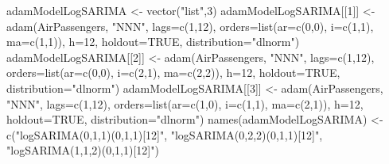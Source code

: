 \documentclass[
]{book}
\newenvironment{Shaded}{\begin{snugshade}}{\end{snugshade}}
\newcommand{\AttributeTok}[1]{\textcolor[rgb]{0.77,0.63,0.00}{#1}}
\newcommand{\ConstantTok}[1]{\textcolor[rgb]{0.00,0.00,0.00}{#1}}
\newcommand{\DecValTok}[1]{\textcolor[rgb]{0.00,0.00,0.81}{#1}}
\newcommand{\FunctionTok}[1]{\textcolor[rgb]{0.00,0.00,0.00}{#1}}
\newcommand{\NormalTok}[1]{#1}
\newcommand{\OtherTok}[1]{\textcolor[rgb]{0.56,0.35,0.01}{#1}}
\newcommand{\StringTok}[1]{\textcolor[rgb]{0.31,0.60,0.02}{#1}}
\theoremstyle{definition}
\theoremstyle{definition}
\theoremstyle{definition}
\theoremstyle{definition}
\theoremstyle{remark}
\begin{document}
\begin{Shaded}
\begin{Highlighting}[]
\NormalTok{adamModelLogSARIMA }\OtherTok{\textless{}{-}} \FunctionTok{vector}\NormalTok{(}\StringTok{"list"}\NormalTok{,}\DecValTok{3}\NormalTok{)}
\NormalTok{adamModelLogSARIMA[[}\DecValTok{1}\NormalTok{]] }\OtherTok{\textless{}{-}} \FunctionTok{adam}\NormalTok{(AirPassengers, }\StringTok{"NNN"}\NormalTok{, }\AttributeTok{lags=}\FunctionTok{c}\NormalTok{(}\DecValTok{1}\NormalTok{,}\DecValTok{12}\NormalTok{),}
                                \AttributeTok{orders=}\FunctionTok{list}\NormalTok{(}\AttributeTok{ar=}\FunctionTok{c}\NormalTok{(}\DecValTok{0}\NormalTok{,}\DecValTok{0}\NormalTok{), }\AttributeTok{i=}\FunctionTok{c}\NormalTok{(}\DecValTok{1}\NormalTok{,}\DecValTok{1}\NormalTok{), }\AttributeTok{ma=}\FunctionTok{c}\NormalTok{(}\DecValTok{1}\NormalTok{,}\DecValTok{1}\NormalTok{)),}
                                \AttributeTok{h=}\DecValTok{12}\NormalTok{, }\AttributeTok{holdout=}\ConstantTok{TRUE}\NormalTok{, }\AttributeTok{distribution=}\StringTok{"dlnorm"}\NormalTok{)}
\NormalTok{adamModelLogSARIMA[[}\DecValTok{2}\NormalTok{]] }\OtherTok{\textless{}{-}} \FunctionTok{adam}\NormalTok{(AirPassengers, }\StringTok{"NNN"}\NormalTok{, }\AttributeTok{lags=}\FunctionTok{c}\NormalTok{(}\DecValTok{1}\NormalTok{,}\DecValTok{12}\NormalTok{),}
                                \AttributeTok{orders=}\FunctionTok{list}\NormalTok{(}\AttributeTok{ar=}\FunctionTok{c}\NormalTok{(}\DecValTok{0}\NormalTok{,}\DecValTok{0}\NormalTok{), }\AttributeTok{i=}\FunctionTok{c}\NormalTok{(}\DecValTok{2}\NormalTok{,}\DecValTok{1}\NormalTok{), }\AttributeTok{ma=}\FunctionTok{c}\NormalTok{(}\DecValTok{2}\NormalTok{,}\DecValTok{2}\NormalTok{)),}
                                \AttributeTok{h=}\DecValTok{12}\NormalTok{, }\AttributeTok{holdout=}\ConstantTok{TRUE}\NormalTok{, }\AttributeTok{distribution=}\StringTok{"dlnorm"}\NormalTok{)}
\NormalTok{adamModelLogSARIMA[[}\DecValTok{3}\NormalTok{]] }\OtherTok{\textless{}{-}} \FunctionTok{adam}\NormalTok{(AirPassengers, }\StringTok{"NNN"}\NormalTok{, }\AttributeTok{lags=}\FunctionTok{c}\NormalTok{(}\DecValTok{1}\NormalTok{,}\DecValTok{12}\NormalTok{),}
                                \AttributeTok{orders=}\FunctionTok{list}\NormalTok{(}\AttributeTok{ar=}\FunctionTok{c}\NormalTok{(}\DecValTok{1}\NormalTok{,}\DecValTok{0}\NormalTok{), }\AttributeTok{i=}\FunctionTok{c}\NormalTok{(}\DecValTok{1}\NormalTok{,}\DecValTok{1}\NormalTok{), }\AttributeTok{ma=}\FunctionTok{c}\NormalTok{(}\DecValTok{2}\NormalTok{,}\DecValTok{1}\NormalTok{)),}
                                \AttributeTok{h=}\DecValTok{12}\NormalTok{, }\AttributeTok{holdout=}\ConstantTok{TRUE}\NormalTok{, }\AttributeTok{distribution=}\StringTok{"dlnorm"}\NormalTok{)}
\FunctionTok{names}\NormalTok{(adamModelLogSARIMA) }\OtherTok{\textless{}{-}} \FunctionTok{c}\NormalTok{(}\StringTok{"logSARIMA(0,1,1)(0,1,1)[12]"}\NormalTok{,}
                               \StringTok{"logSARIMA(0,2,2)(0,1,1)[12]"}\NormalTok{,}
                               \StringTok{"logSARIMA(1,1,2)(0,1,1)[12]"}\NormalTok{)}
\end{Highlighting}
\end{Shaded}
\end{document}
